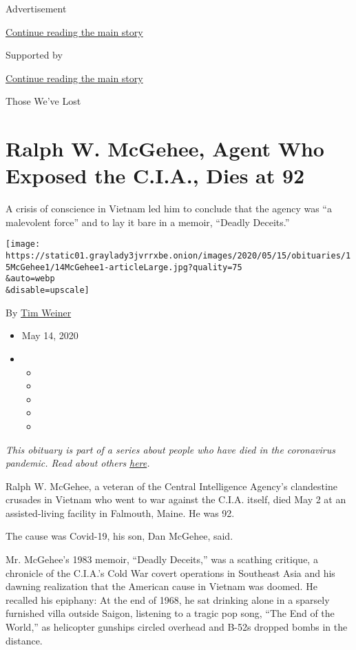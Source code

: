Advertisement

\protect\hyperlink{after-top}{Continue reading the main story}

Supported by

\protect\hyperlink{after-sponsor}{Continue reading the main story}

Those We've Lost

\hypertarget{ralph-w-mcgehee-agent-who-exposed-the-cia-dies-at-92}{%
\section{Ralph W. McGehee, Agent Who Exposed the C.I.A., Dies at
92}\label{ralph-w-mcgehee-agent-who-exposed-the-cia-dies-at-92}}

A crisis of conscience in Vietnam led him to conclude that the agency
was ``a malevolent force'' and to lay it bare in a memoir, ``Deadly
Deceits.''

\texttt{[image: https://static01.graylady3jvrrxbe.onion/images/2020/05/15/obituaries/15McGehee1/14McGehee1-articleLarge.jpg?quality=75\\\&auto=webp\\\&disable=upscale]}

By \href{https://www.nytimes3xbfgragh.onion/by/tim-weiner}{Tim Weiner}

\begin{itemize}
\item
  May 14, 2020
\item
  \begin{itemize}
  \item
  \item
  \item
  \item
  \item
  \end{itemize}
\end{itemize}

\emph{This obituary is part of a series about people who have died in
the coronavirus pandemic. Read about others}
\href{https://www.nytimes3xbfgragh.onion/series/people-who-have-died-of-the-coronavirus}{\emph{here}}\emph{.}

Ralph W. McGehee, a veteran of the Central Intelligence Agency's
clandestine crusades in Vietnam who went to war against the C.I.A.
itself, died May 2 at an assisted-living facility in Falmouth, Maine. He
was 92.

The cause was Covid-19, his son, Dan McGehee, said.

Mr. McGehee's 1983 memoir, ``Deadly Deceits,'' was a scathing critique,
a chronicle of the C.I.A.'s Cold War covert operations in Southeast Asia
and his dawning realization that the American cause in Vietnam was
doomed. He recalled his epiphany: At the end of 1968, he sat drinking
alone in a sparsely furnished villa outside Saigon, listening to a
tragic pop song, ``The End of the World,'' as helicopter gunships
circled overhead and B-52s dropped bombs in the distance.


